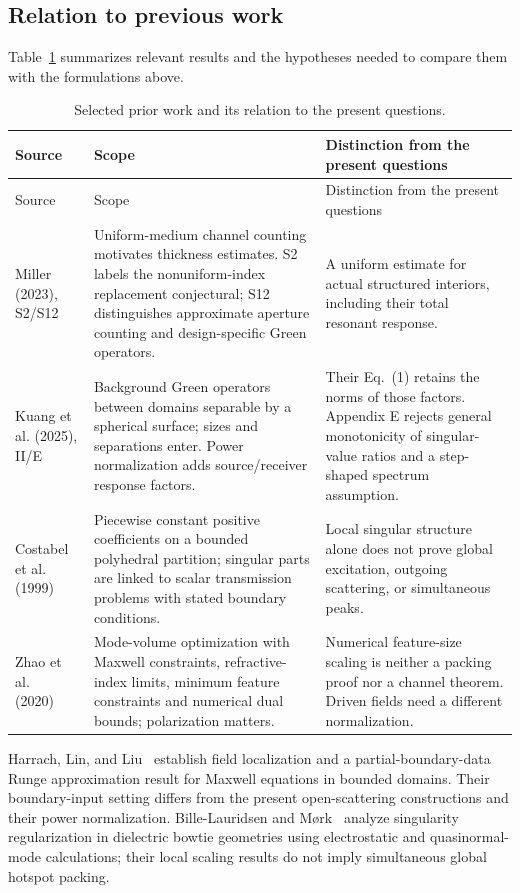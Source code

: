 \subsection{Relation to previous work}
Table~\ref{pr:prior-art} summarizes relevant results and the hypotheses
needed to compare them with the formulations above.
\begin{longtable}{@{}p{}p{}p{}@{}}
\caption{Selected prior work and its relation to the present questions.}\label{pr:prior-art}\\
\toprule Source & Scope & Distinction from the present questions\\\midrule\endfirsthead
\toprule Source & Scope & Distinction from the present questions\\\midrule\endhead
Miller (2023), S2/S12~\cite{miller2023} & Uniform-medium channel counting motivates thickness estimates. S2 labels the nonuniform-index replacement conjectural; S12 distinguishes approximate aperture counting and design-specific Green operators. & A uniform estimate for actual structured interiors, including their total resonant response.\\[4pt]
Kuang et al. (2025), II/E~\cite{kuang2025} & Background Green operators between domains separable by a spherical surface; sizes and separations enter. Power normalization adds source/receiver response factors. & Their Eq.~(1) retains the norms of those factors. Appendix E rejects general monotonicity of singular-value ratios and a step-shaped spectrum assumption.\\[4pt]
Costabel et al. (1999)~\cite{costabel1999} & Piecewise constant positive coefficients on a bounded polyhedral partition; singular parts are linked to scalar transmission problems with stated boundary conditions. & Local singular structure alone does not prove global excitation, outgoing scattering, or simultaneous peaks.\\[4pt]
Zhao et al. (2020)~\cite{zhao2020} & Mode-volume optimization with Maxwell constraints, refractive-index limits, minimum feature constraints and numerical dual bounds; polarization matters. & Numerical feature-size scaling is neither a packing proof nor a channel theorem. Driven fields need a different normalization.\\
\bottomrule
\end{longtable}

Harrach, Lin, and Liu~\cite{harrach2018} establish field localization and
a partial-boundary-data Runge approximation result for Maxwell equations
in bounded domains. Their boundary-input setting differs from the present
open-scattering constructions and their power normalization. Bille-Lauridsen
and M\o rk~\cite{billeLauridsen2026} analyze singularity regularization in
dielectric bowtie geometries using electrostatic and quasinormal-mode
calculations; their local scaling results do not imply simultaneous global
hotspot packing.

